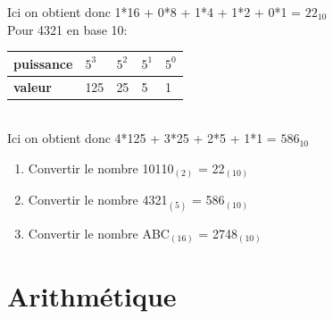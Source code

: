 \begin{Exercice}[15 minutes]
\begin{solution}
        Ici on obtient donc 1*16 + 0*8 + 1*4 + 1*2 + 0*1 = $22_{10}$ \\


        Pour 4321 en base 10: \\
        
        \begin{tabular}{| C{0.1\textwidth} | C{0.1\textwidth} | C{0.1\textwidth} | C{0.1\textwidth} | C{0.1\textwidth} |} 
            \hline
            \textbf{puissance} & $5^{3}$ & $5^{2}$ & $5^{1}$ & $5^{0}$ \\ [0.5ex] 
            \hline
            \textbf{valeur} & 125 & 25 & 5 & 1 \\ [0.5ex] 
            \hline
        \end{tabular} \\
        
        Ici on obtient donc 4*125 + 3*25 + 2*5 + 1*1 = $586_{10}$ \\
        
        \begin{enumerate}
        \item Convertir le nombre 10110$_{(2)}$  = 22$_{(10)}$
        \item Convertir le nombre 4321$_{(5)}$ = 586$_{(10)}$
        \item Convertir le nombre ABC$_{(16)}$ = 2748$_{(10)}$
        \end{enumerate}
    
    \end{solution}

\end{Exercice}

\section{Arithmétique}

